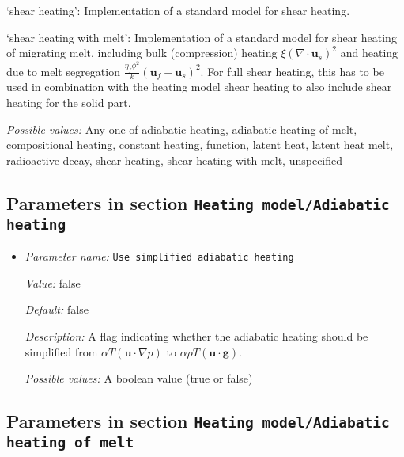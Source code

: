 \begin{itemize}
`shear heating': Implementation of a standard model for shear heating.

`shear heating with melt': Implementation of a standard model for shear heating of migrating melt, including bulk (compression) heating $\xi \left( \nabla \cdot \mathbf u_s \right)^2 $ and heating due to melt segregation $\frac{\eta_f \phi^2}{k} \left( \mathbf u_f - \mathbf u_s \right)^2 $. For full shear heating, this has to be used in combination with the heating model shear heating to also include shear heating for the solid part.


{\it Possible values:} Any one of adiabatic heating, adiabatic heating of melt, compositional heating, constant heating, function, latent heat, latent heat melt, radioactive decay, shear heating, shear heating with melt, unspecified
\end{itemize}



\subsection{Parameters in section \tt Heating model/Adiabatic heating}
\label{parameters:Heating_20model/Adiabatic_20heating}

\begin{itemize}
\item {\it Parameter name:} {\tt Use simplified adiabatic heating}
\label{parameters:Heating model/Adiabatic heating/Use simplified adiabatic heating}


{\it Value:} false


{\it Default:} false


{\it Description:} A flag indicating whether the adiabatic heating should be simplified from $\alpha T (\mathbf u \cdot \nabla p)$ to $ \alpha \rho T (\mathbf u \cdot \mathbf g) $.


{\it Possible values:} A boolean value (true or false)
\end{itemize}

\subsection{Parameters in section \tt Heating model/Adiabatic heating of melt}
\label{parameters:Heating_20model/Adiabatic_20heating_20of_20melt}

